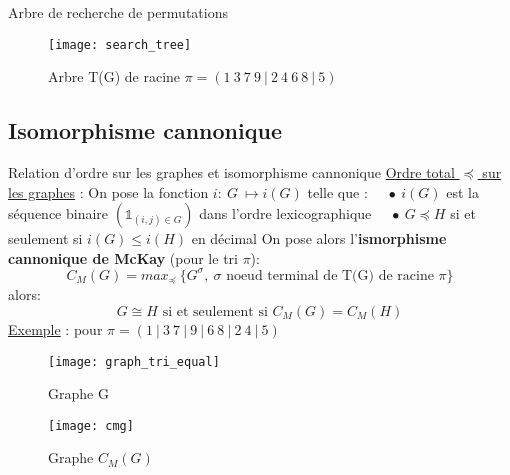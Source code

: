 \begin{frame}{Arbre de recherche de permutations}
    \begin{figure}[!htb]
        \texttt{[image: search\_tree]}
        \caption{\label{fig:Arbre T(G)} Arbre T(G) de racine $\pi=(1\ 3\ 7\ 9\ |\ 2\ 4\ 6\ 8\ |\ 5)$}
    \end{figure}
\end{frame}

\subsection{Isomorphisme cannonique}
\begin{frame}{Relation d'ordre sur les graphes et isomorphisme cannonique}
    \underline{Ordre total $\preceq$ sur les graphes} : \newline \newline
    On pose la fonction $i:\ G\ \longmapsto i(G)$ telle que : \newline
    $\quad \bullet \ i(G)$ est la séquence binaire $(\mathds{1}_{(i,j)\in G})$ dans l'ordre lexicographique \newline
    $\quad \bullet \ G \preceq H$ si et seulement si $i(G) \leq i(H)$ en décimal
    \newline \newline
    On pose alors l'\textbf{ismorphisme cannonique de McKay} (pour le tri $\pi$):
    \begin{equation}
        \boxed{C_M(G) = max_{\preceq}\ \lbrace G^{\sigma},\ \sigma \text{ noeud terminal de T(G) de racine } \pi \rbrace }
    \end{equation}
    alors:
    \begin{equation}
        \boxed{G \cong H \text{ si et seulement si } C_M(G) = C_M(H)}
    \end{equation}
    \newline
    \underline{Exemple} : pour $\pi = (1\ |\ 3\ 7\ |\ 9\ |\ 6\ 8\ |\ 2\ 4\ |\ 5)$
    \begin{multicols}{2}
        \begin{figure}[!htb]
            \centering
            \texttt{[image: graph\_tri\_equal]}
            \caption{\label{fig: Graphe G}Graphe G}
        \end{figure}
        \vspace*{1cm}
        \begin{figure}[!htb]
            \centering
            \texttt{[image: cmg]}
            \caption{\label{fig: Isomorphe G} Graphe $C_M(G)$}
        \end{figure}
    \end{multicols}
\end{frame}


